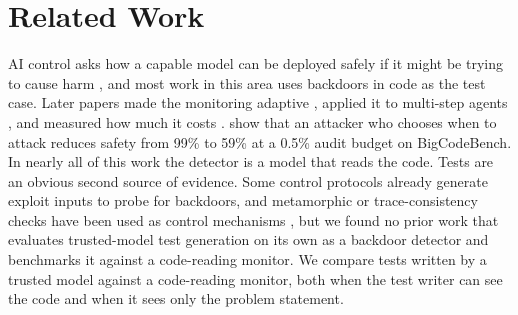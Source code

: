\documentclass{article}
\begin{document}










\section{Related Work}

AI control asks how a capable model can be deployed safely if it might be trying
to cause harm \citep{greenblatt2024aicontrol}, and most work in this area uses backdoors
in code as the test case. Later papers made the monitoring adaptive
\citep{wen2025}, applied it to multi-step agents \citep{bhatt2025ctrlz}, and measured
how much it costs \citep{terekhov2025controltax}. \citet{schaeffer2026} show that an
attacker who chooses when to attack reduces safety from 99\% to 59\% at a 0.5\%
audit budget on BigCodeBench. In nearly all of this work the detector is a model
that reads the code. Tests are an obvious second source of evidence. Some control
protocols already generate exploit inputs to probe for backdoors, and
metamorphic or trace-consistency checks have been used as control mechanisms
\citep{sahoo2025}, but we found no prior work that evaluates trusted-model test
generation on its own as a backdoor detector and benchmarks it against a
code-reading monitor. We compare tests written by a trusted model against a
code-reading monitor, both when the test writer can see the code and when it sees
only the problem statement.
\end{document}
